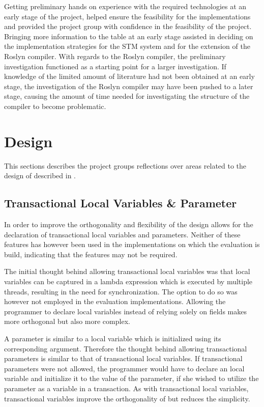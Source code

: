 Getting preliminary hands on experience with the required technologies at an early stage of the project, helped ensure the feasibility for the implementations and provided the project group with confidence in the feasibility of the project. Bringing more information to the table at an early stage assisted in deciding on the implementation strategies for the \ac{STM} system and for the extension of the Roslyn compiler. With regards to the Roslyn compiler, the preliminary investigation functioned as a starting point for a larger investigation. If knowledge of the limited amount of literature had not been obtained at an early stage, the investigation of the Roslyn compiler may have been pushed to a later stage, causing the amount of time needed for investigating the structure of the compiler to become problematic.

\section{Design}\label{sec:reflection_design}
This sections describes the project groups reflections over areas related to the design of \stmname described in . 

\subsection{Transactional Local Variables \& Parameter}
In order to improve the orthogonality and flexibility of \stmname the design allows for the declaration of transactional local variables and parameters. Neither of these features has however been used in the implementations on which the evaluation is build, indicating that the features may not be required. 

The initial thought behind allowing transactional local variables was that local variables can be captured in a lambda expression which is executed by multiple threads, resulting in the need for synchronization. The option to do so was however not employed in the evaluation implementations. Allowing the programmer to declare  local variables instead of relying solely on  fields makes \stmnamesp more orthogonal but also more complex.

A parameter is similar to a local variable which is initialized using its corresponding argument\cite[p. 76]{sestoft2011c}. Therefore the thought behind allowing transactional parameters is similar to that of transactional local variables. If transactional parameters were not allowed, the programmer would have to declare an  local variable and initialize it to the value of the parameter, if she wished to utilize the parameter as a variable in a transaction. As with transactional local variables, transactional variables improve the orthogonality of \stmname but reduces the simplicity.


